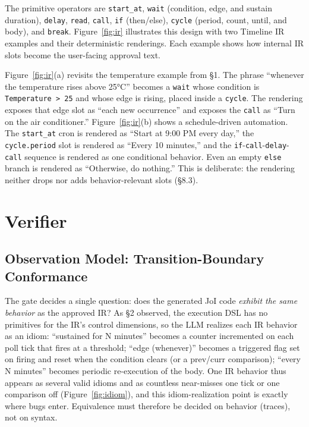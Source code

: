 \documentclass[sigconf,nonacm,anonymous,review]{acmart}
\begin{document}
The primitive operators are \texttt{start\_at}, \texttt{wait} (condition, edge, and sustain duration), \texttt{delay}, \texttt{read}, \texttt{call}, \texttt{if} (then/else), \texttt{cycle} (period, count, until, and body), and \texttt{break}. Figure~\ref{fig:ir} illustrates this design with two Timeline IR examples and their deterministic renderings. Each example shows how internal IR slots become the user-facing approval text.

Figure~\ref{fig:ir}(a) revisits the temperature example from \S1. The phrase ``whenever the temperature rises above 25°C'' becomes a \texttt{wait} whose condition is \texttt{Temperature > 25} and whose edge is rising, placed inside a \texttt{cycle}. The rendering exposes that edge slot as ``each new occurrence'' and exposes the \texttt{call} as ``Turn on the air conditioner.'' Figure~\ref{fig:ir}(b) shows a schedule-driven automation. The \texttt{start\_at} cron is rendered as ``Start at 9:00 PM every day,'' the \texttt{cycle.period} slot is rendered as ``Every 10 minutes,'' and the \texttt{if}-\texttt{call}-\texttt{delay}-\texttt{call} sequence is rendered as one conditional behavior. Even an empty \texttt{else} branch is rendered as ``Otherwise, do nothing.'' This is deliberate: the rendering neither drops nor adds behavior-relevant slots (\S8.3).

\section{Verifier}

\subsection{Observation Model: Transition-Boundary Conformance}

The gate decides a single question: does the generated JoI code \emph{exhibit the same behavior} as the approved IR? As \S2 observed, the execution DSL has no primitives for the IR's control dimensions, so the LLM realizes each IR behavior as an idiom: ``sustained for N minutes'' becomes a counter incremented on each poll tick that fires at a threshold; ``edge (whenever)'' becomes a triggered flag set on firing and reset when the condition clears (or a prev/curr comparison); ``every N minutes'' becomes periodic re-execution of the body. One IR behavior thus appears as several valid idioms and as countless near-misses one tick or one comparison off (Figure~\ref{fig:idiom}), and this idiom-realization point is exactly where bugs enter. Equivalence must therefore be decided on behavior (traces), not on syntax.
\end{document}
